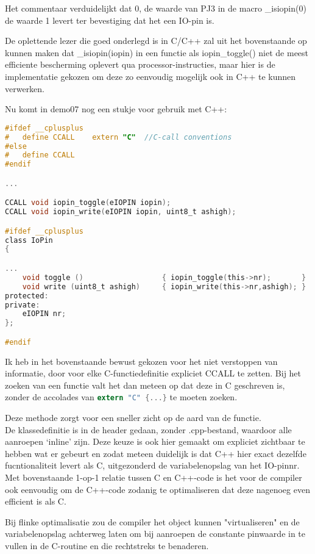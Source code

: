 \documentclass[a4paper, 11pt, fleqn, twoside]{scrartcl}%
\begin{document}
Het commentaar verduidelijkt dat 0, de waarde van PJ3 in de macro \_isiopin(0)
de waarde 1 levert ter bevestiging dat het een IO-pin is.

De oplettende lezer die goed onderlegd is in C/C++ zal uit het bovenstaande
op kunnen maken dat \_isiopin(iopin) in een functie als iopin\_toggle() niet
de meest efficiente bescherming oplevert qua processor-instructies, maar hier 
is de implementatie gekozen om deze zo eenvoudig mogelijk ook in C++ te kunnen 
verwerken.

Nu komt in demo07 nog een stukje voor gebruik met C++:
\begin{lstlisting}[language=C,backgroundcolor=\color{orange!10},framerule=0pt,columns=fixed]
#ifdef __cplusplus
#	define CCALL	extern "C"	//C-call conventions
#else
#	define CCALL
#endif

...

CCALL void iopin_toggle(eIOPIN iopin);
CCALL void iopin_write(eIOPIN iopin, uint8_t ashigh);

#ifdef __cplusplus
class IoPin
{

...
	void toggle ()					{ iopin_toggle(this->nr);		}
	void write (uint8_t ashigh)		{ iopin_write(this->nr,ashigh);	}
protected:
private:
	eIOPIN nr;
};

#endif
\end{lstlisting}

Ik heb in het bovenstaande bewust gekozen voor het niet verstoppen van 
informatie, door voor elke C-functiedefinitie expliciet CCALL te zetten.
Bij het zoeken van een functie valt het dan meteen op dat deze in C geschreven 
is, zonder de accolades van \lstinline[language=C]!extern "C" {...}! te
moeten zoeken.

Deze methode zorgt voor een sneller zicht op de aard van de functie.\\

De klassedefinitie is in de header gedaan, zonder .cpp-bestand, waardoor 
alle aanroepen `inline' zijn. Deze keuze is ook hier gemaakt om expliciet 
zichtbaar te hebben wat er gebeurt en zodat meteen duidelijk is dat C++ 
hier exact dezelfde fucntionaliteit levert als C, uitgezonderd de 
variabelenopslag van het IO-pinnr.\\

Met bovenstaande 1-op-1 relatie tussen C en C++-code is het voor de compiler 
ook eenvoudig om de C++-code zodanig te optimaliseren dat deze nagenoeg even 
efficient is als C.

Bij flinke optimalisatie zou de compiler het object kunnen "virtualiseren" 
en de variabelenopslag achterweg laten om bij aanroepen de constante pinwaarde 
in te vullen in de C-routine en die rechtstreks te benaderen.
\end{document}
